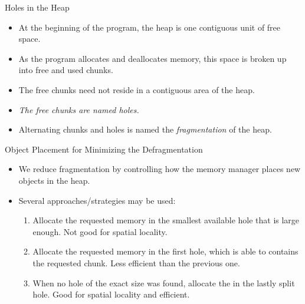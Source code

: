 \begin{bibunit}[apalike]
\begin{frame}{Holes in the Heap}
	\begin{itemize}
	\item At the beginning of the program, the heap is one contiguous unit of free space.
	\vfill
	\item As the program allocates and deallocates memory, this space is broken up into free and used chunks.
	\vfill
	\item The free chunks need not reside in a contiguous area of the heap.
	\vfill
	\item \emph{The free chunks are named holes.}
	\vfill
	\item Alternating chunks and holes is named the \emph{fragmentation} of the heap.
	\end{itemize}
\end{frame}

\begin{frame}{Object Placement for Minimizing the Defragmentation}
	\begin{itemize}
	\item We reduce fragmentation by controlling how the memory manager places new objects in the heap.
	\vfill
	\item Several approaches/strategies may be used:
		\vfill
		\begin{enumerate}
		\item[Best-Fit Object Placement] Allocate the requested memory in the smallest available hole that is large enough. Not good for spatial locality.
		\vfill
		\item[First-Fit Object Placement] Allocate the requested memory in the first hole, which is able to contains the requested chunk. Less efficient than the previous one.
		\vfill
		\item[Next-Fit Object Placement] When no hole of the exact size was found, allocate the in the lastly split hole. Good for spatial locality and efficient.
		\end{enumerate}
	\end{itemize}
\end{frame}


\end{bibunit}
